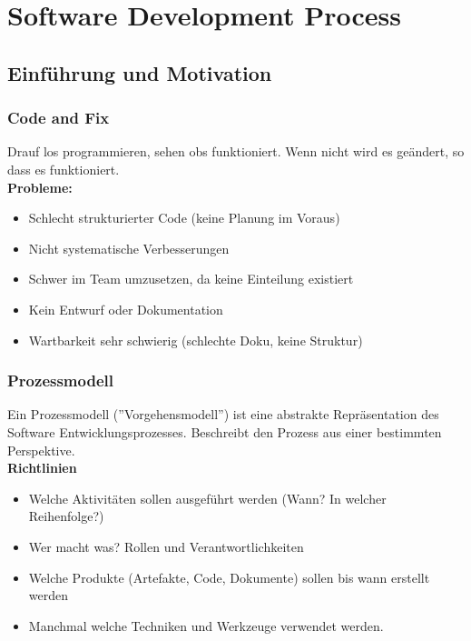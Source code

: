 \chapter{Software Development Process}

\section{Einführung und Motivation}
\subsection{Code and Fix}
Drauf los programmieren, sehen obs funktioniert. Wenn nicht wird es geändert,
so dass es funktioniert. \\

\textbf{Probleme:}
\begin{itemize}
    \item Schlecht strukturierter Code (keine Planung im Voraus)
    \item Nicht systematische Verbesserungen
    \item Schwer im Team umzusetzen, da keine Einteilung existiert
    \item Kein Entwurf oder Dokumentation
    \item Wartbarkeit sehr schwierig (schlechte Doku, keine Struktur)
\end{itemize}

\subsection{Prozessmodell}
Ein Prozessmodell (''Vorgehensmodell'') ist eine abstrakte Repräsentation
des Software Entwicklungsprozesses. Beschreibt den Prozess aus einer bestimmten
Perspektive.\\

\textbf{Richtlinien}
\begin{itemize}
    \item Welche Aktivitäten sollen ausgeführt werden (Wann? In welcher
    Reihenfolge?)
    \item Wer macht was? Rollen und Verantwortlichkeiten
    \item Welche Produkte (Artefakte, Code, Dokumente) sollen bis wann erstellt
    werden
    \item Manchmal welche Techniken und Werkzeuge verwendet werden.
\end{itemize}
